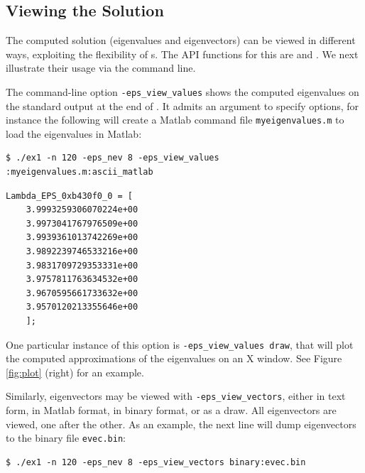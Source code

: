 \subsection{Viewing the Solution}
\label{sec:epsviewers}

The computed solution (eigenvalues and eigenvectors) can be viewed in different ways, exploiting the flexibility of s. The API functions for this are  and . We next illustrate their usage via the command line.

The command-line option \Verb!-eps_view_values! shows the computed eigenvalues on the standard output at the end of . It admits an argument to specify  options, for instance the following will create a Matlab command file \texttt{myeigenvalues.m} to load the eigenvalues in Matlab:
\begin{Verbatim}[fontsize=\footnotesize,numbers=none]
   $ ./ex1 -n 120 -eps_nev 8 -eps_view_values :myeigenvalues.m:ascii_matlab
\end{Verbatim}

\begin{Verbatim}[fontsize=\footnotesize,numbers=none]
    Lambda_EPS_0xb430f0_0 = [
    3.9993259306070224e+00
    3.9973041767976509e+00
    3.9939361013742269e+00
    3.9892239746533216e+00
    3.9831709729353331e+00
    3.9757811763634532e+00
    3.9670595661733632e+00
    3.9570120213355646e+00
    ];
\end{Verbatim}

One particular instance of this option is \Verb!-eps_view_values draw!, that will plot the computed approximations of the eigenvalues on an X window. See Figure \ref{fig:plot} (right) for an example.

Similarly, eigenvectors may be viewed with \Verb!-eps_view_vectors!, either in text form, in Matlab format, in binary format, or as a draw. All eigenvectors are viewed, one after the other. As an example, the next line will dump eigenvectors to the binary file \texttt{evec.bin}:
\begin{Verbatim}[fontsize=\footnotesize,numbers=none]
   $ ./ex1 -n 120 -eps_nev 8 -eps_view_vectors binary:evec.bin
\end{Verbatim}

